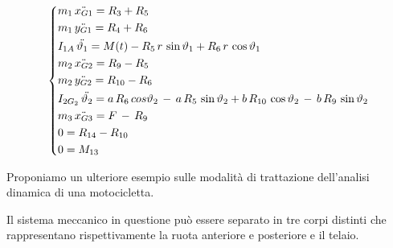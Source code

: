 \[
\begin{dcases}
m_1\,\ddot{x_{G1}} = R_3 + R_5\\
m_1\,\ddot{y_{G1}} = R_4 + R_6\\
I_{1A}\,\ddot{\theta_1} = M(t) - R_5\,r\,\sin{\theta_1} + R_6\,r\,\cos{\theta_1}\\
m_2\,\ddot{x_{G2}} = R_9 - R_5\\
m_2\,\ddot{y_{G2}} = R_{10} - R_6\\
I_{2G_2}\,\ddot{\theta_2} = a\,R_6\,cos{\theta_2}\,-\,a\,R_5\,\sin{\theta_2}+b\,R_{10}\,\cos{\theta_2}\,-\,b\,R_9\,\sin{\theta_2}\\
m_3\,\ddot{x_{G3}} = F\,-\,R_9\\
0 = R_{14} - R_{10}\\
0 = M_{13}
\end{dcases}
\]

Proponiamo un ulteriore esempio sulle modalità di trattazione dell'analisi dinamica di una motocicletta.

Il sistema meccanico in questione può essere separato in tre corpi distinti che rappresentano rispettivamente la ruota anteriore e posteriore e il telaio.

